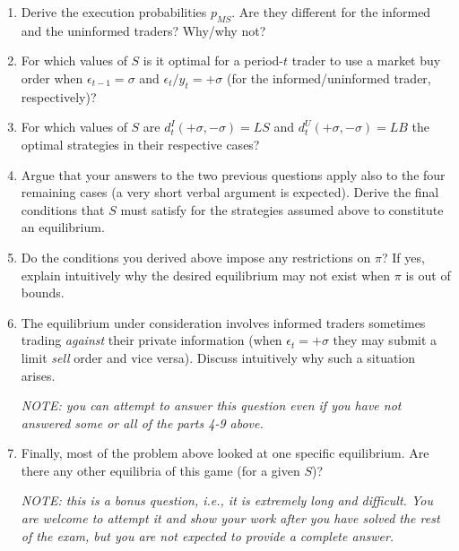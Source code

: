 \documentclass[a4paper]{article}
\newif\ifsolutions
\begin{document}
	\begin{enumerate}[resume]
		\item Derive the execution probabilities $p_{MS}$. Are they different for the informed and the uninformed traders? Why/why not?
		
		\item For which values of $S$ is it optimal for a period-$t$ trader to use a market buy order when $\epsilon_{t-1}=\sigma$ and $\epsilon_t/y_t=+\sigma$ (for the informed/uninformed trader, respectively)?
		
		\item For which values of $S$ are $d^I_t(+\sigma, -\sigma) = LS$ and $d^U_t(+\sigma, -\sigma) = LB$ the optimal strategies in their respective cases?
		
		\item Argue that your answers to the two previous questions apply also to the four remaining cases (a very short verbal argument is expected). Derive the final conditions that $S$ must satisfy for the strategies assumed above to constitute an equilibrium.
		
		\item Do the conditions you derived above impose any restrictions on $\pi$? If yes, explain intuitively why the desired equilibrium may not exist when $\pi$ is out of bounds.
		
		\item The equilibrium under consideration involves informed traders sometimes trading \emph{against} their private information (when $\epsilon_t=+\sigma$ they may submit a limit \emph{sell} order and vice versa). Discuss intuitively why such a situation arises.
		
		\emph{NOTE: you can attempt to answer this question even if you have not answered some or all of the parts 4-9 above.}
		
		\item Finally, most of the problem above looked at one specific equilibrium. Are there any other equilibria of this game (for a given $S$)?
		
		\emph{NOTE: this is a bonus question, i.e., it is extremely long and difficult. You are welcome to attempt it and show your work after you have solved the rest of the exam, but you are not expected to provide a complete answer.}
	\end{enumerate}




\ifsolutions
\end{document}
